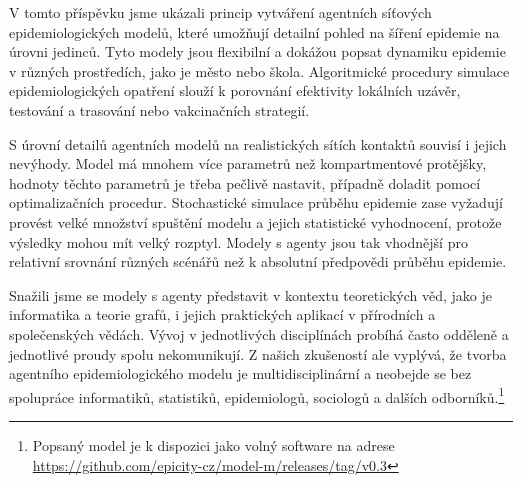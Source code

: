 V tomto příspěvku jsme ukázali princip vytváření agentních síťových epidemiologických modelů, které umožňují detailní pohled na šíření epidemie na úrovni jedinců. Tyto modely jsou flexibilní a dokážou popsat dynamiku epidemie v různých prostředích, jako je město nebo škola. Algoritmické procedury simulace epidemiologických opatření slouží k porovnání efektivity lokálních uzávěr, testování a trasování nebo vakcinačních strategií. 

S úrovní detailů agentních modelů na realistických sítích kontaktů souvisí i jejich nevýhody. Model má mnohem více parametrů než kompartmentové protějšky, hodnoty těchto parametrů je třeba pečlivě nastavit, případně doladit pomocí optimalizačních procedur. Stochastické simulace průběhu epidemie zase vyžadují provést velké množství spuštění modelu a jejich statistické vyhodnocení, protože výsledky mohou mít velký rozptyl. Modely s agenty jsou tak vhodnější pro relativní srovnání různých scénářů než k absolutní předpovědi průběhu epidemie. 

Snažili jsme se modely s agenty představit v kontextu teoretických věd, jako je informatika a teorie grafů, i jejich praktických aplikací v přírodních a společenských vědách. Vývoj v jednotlivých disciplínách probíhá často odděleně a jednotlivé proudy spolu nekomunikují. Z našich zkušeností ale vyplývá, že tvorba agentního epidemiologického modelu je multidisciplinární a neobejde se bez spolupráce informatiků, statistiků, epidemiologů, sociologů a dalších odborníků.\footnote{Popsaný model je k dispozici jako volný software na adrese \url{https://github.com/epicity-cz/model-m/releases/tag/v0.3}} 